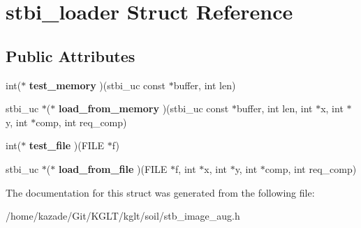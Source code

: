 \hypertarget{structstbi__loader}{\section{stbi\-\_\-loader Struct Reference}
\label{structstbi__loader}
}
\subsection*{Public Attributes}
\begin{DoxyCompactItemize}
\item 
\hypertarget{structstbi__loader_a201eb378b8088dedddab3b0877ddb28e}{int($\ast$ {\bfseries test\-\_\-memory} )(stbi\-\_\-uc const $\ast$buffer, int len)}\label{structstbi__loader_a201eb378b8088dedddab3b0877ddb28e}

\item 
\hypertarget{structstbi__loader_a0c73a72aaee24c2ecd57d37227ad0ea9}{stbi\-\_\-uc $\ast$($\ast$ {\bfseries load\-\_\-from\-\_\-memory} )(stbi\-\_\-uc const $\ast$buffer, int len, int $\ast$x, int $\ast$y, int $\ast$comp, int req\-\_\-comp)}\label{structstbi__loader_a0c73a72aaee24c2ecd57d37227ad0ea9}

\item 
\hypertarget{structstbi__loader_a70a23fd7d611819a0dc22dc82546f87b}{int($\ast$ {\bfseries test\-\_\-file} )(F\-I\-L\-E $\ast$f)}\label{structstbi__loader_a70a23fd7d611819a0dc22dc82546f87b}

\item 
\hypertarget{structstbi__loader_a8069fd62c4a48286dc40f42506864e00}{stbi\-\_\-uc $\ast$($\ast$ {\bfseries load\-\_\-from\-\_\-file} )(F\-I\-L\-E $\ast$f, int $\ast$x, int $\ast$y, int $\ast$comp, int req\-\_\-comp)}\label{structstbi__loader_a8069fd62c4a48286dc40f42506864e00}

\end{DoxyCompactItemize}


The documentation for this struct was generated from the following file\-:\begin{DoxyCompactItemize}
\item 
/home/kazade/\-Git/\-K\-G\-L\-T/kglt/soil/stb\-\_\-image\-\_\-aug.\-h\end{DoxyCompactItemize}
